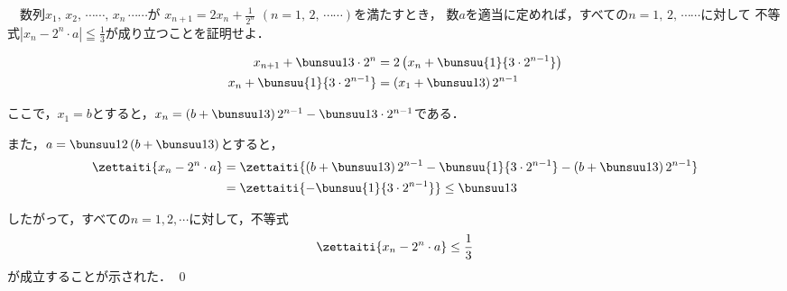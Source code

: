 \begin{problem}
  　数列$x_1, \, x_2, \, \cdots\cdots, \, x_n \, \cdots\cdots$が
$\displaystyle x_{n+1}=2x_n+\frac{1}{2^n}$ $(n=1, \, 2, \, \cdots\cdots)$を満たすとき，
数$a$を適当に定めれば，すべての$n=1, \, 2, \, \cdots\cdots$に対して
不等式$\displaystyle|x_n-2^n \cdot a|\leqq\frac{1}{3}$が成り立つことを証明せよ．
\end{problem}

\noindent\kaie
\begin{align*}
  x_{n+1} + \bunsuu1{3\cdot 2^n} &= 2\left(x_n + \bunsuu{1}{3 \cdot 2^{n-1}}\right) \\
  x_n + \bunsuu{1}{3\cdot 2^{n-1}} &= \left(x_1 + \bunsuu13\right) 2^{n-1}
\end{align*}

ここで，$x_1 = b$とすると，$x_n = \left(b + \bunsuu13\right) 2^{n-1} - \bunsuu1{3\cdot 2^{n-1}}$である．

また，$a = \bunsuu12 \left(b + \bunsuu13\right)$とすると，
\begin{align*}
  \zettaiti{x_n - 2^n \cdot a} &=
  \zettaiti{\left(b + \bunsuu13\right) 2^{n-1} - \bunsuu{1}{3\cdot 2^{n-1}} - \left(b + \bunsuu13\right) 2^{n-1}} \\
  &=\zettaiti{- \bunsuu{1}{3\cdot 2^{n-1}}} \leq \bunsuu13
\end{align*}

したがって，すべての$n = 1,2,\cdots$に対して，不等式
\[\zettaiti{x_n - 2^n \cdot a} \leq \frac13 \]
が成立することが示された．
\qed
